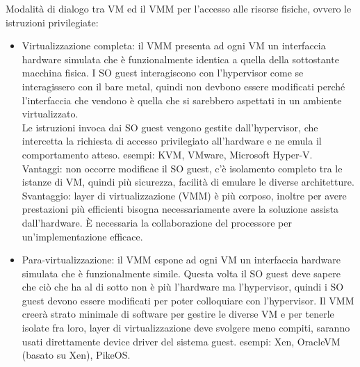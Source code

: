 \documentclass{article}
\begin{document}
Modalità di dialogo tra VM ed il VMM per l'accesso alle risorse fisiche, ovvero le istruzioni privilegiate:
\begin{itemize}
\item Virtualizzazione completa: il VMM presenta ad ogni VM un interfaccia hardware simulata che è funzionalmente identica a quella della sottostante macchina fisica. I SO guest interagiscono con l'hypervisor come se interagissero con il bare metal, quindi non devbono essere modificati perché l'interfaccia che vendono è quella che si sarebbero aspettati in un ambiente virtualizzato.\\ Le istruzioni invoca dai SO guest vengono gestite dall'hypervisor, che intercetta la richiesta di accesso privilegiato all'hardware e ne emula il comportamento atteso. esempi: KVM, VMware, Microsoft Hyper-V. Vantaggi: non occorre modificae il SO guest, c'è isolamento completo tra le istanze di VM, quindi più sicurezza, facilità di emulare le diverse architetture. Svantaggio: layer di virtualizzazione (VMM) è più corposo, inoltre per avere prestazioni più efficienti bisogna necessariamente avere la soluzione assista dall'hardware. È necessaria la collaborazione del processore per un'implementazione efficace.
\item Para-virtualizzazione: il VMM espone ad ogni VM un interfaccia hardware simulata che è funzionalmente simile. Questa volta il SO guest deve sapere che ciò che ha al di sotto non è più l'hardware ma l'hypervisor, quindi i SO guest devono essere modificati per poter colloquiare con l'hypervisor. Il VMM creerà strato minimale di software per gestire le diverse VM e per tenerle isolate fra loro, layer di virtualizzazione deve svolgere meno compiti, saranno usati direttamente device driver del sistema guest. esempi: Xen, OracleVM (basato su Xen), PikeOS.
\end{itemize}
\end{document}

